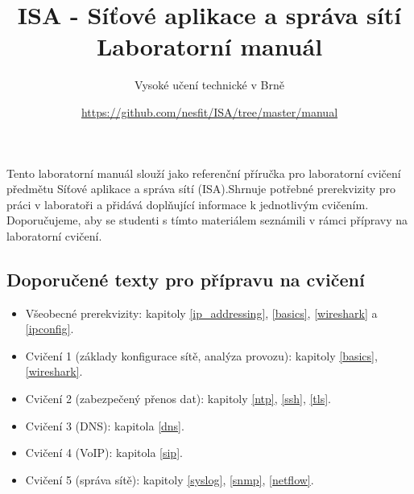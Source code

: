 \documentclass[a4paper,11pt]{article}
\title{ISA - Síťové aplikace a správa sítí\\
{\bf\large Laboratorní manuál}}
\author{Vysoké učení technické v Brně}
\date{\url{https://github.com/nesfit/ISA/tree/master/manual}}
\begin{document}
{\let\newpage\relax\maketitle}

Tento laboratorní manuál slouží jako referenční příručka pro laboratorní cvičení předmětu Síťové aplikace a správa sítí (ISA).Shrnuje potřebné prerekvizity pro práci v laboratoři a přidává doplňující informace k jednotlivým cvičením. Doporučujeme, aby se studenti s tímto materiálem seznámili v rámci přípravy na laboratorní cvičení. 

\subsection*{Doporučené texty pro přípravu na cvičení}
\begin{itemize}
  \item Všeobecné prerekvizity: kapitoly \ref{ip_addressing}, \ref{basics}, \ref{wireshark} a \ref{ipconfig}.
  \item Cvičení 1 (základy konfigurace sítě, analýza provozu): kapitoly \ref{basics}, \ref{wireshark}.
  \item Cvičení 2 (zabezpečený přenos dat): kapitoly \ref{ntp}, \ref{ssh}, \ref{tls}.
  \item Cvičení 3 (DNS): kapitola \ref{dns}.
  \item Cvičení 4 (VoIP): kapitola \ref{sip}.
  \item Cvičení 5 (správa sítě): kapitoly \ref{syslog}, \ref{snmp}, \ref{netflow}. 
\end{itemize}

\setcounter{tocdepth}{1}
\tableofcontents
\enlargethispage{3mm}
\newpage


\newpage

\newpage


\clearpage

\newpage

\newpage

\newpage

\newpage

\newpage

\newpage


\newpage




\newpage
\thispagestyle{empty}
\end{document}
